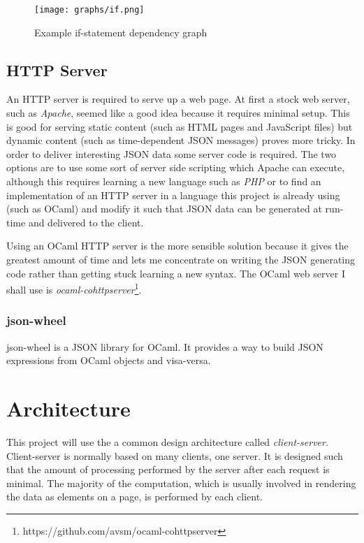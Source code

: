 \begin{figure}
  \centering
  \texttt{[image: graphs/if.png]}
  \caption{Example if-statement dependency graph}
  \label{if_graph}
\end{figure}

\subsection{HTTP Server}
An HTTP server is required to serve up a web page. At first a stock web server, such as \emph{Apache}, seemed like a good idea because it requires minimal setup. This is good for serving static content (such as HTML pages and JavaScript files) but dynamic content (such as time-dependent JSON messages) proves more tricky. In order to deliver interesting JSON data some server code is required. The two options are to use some sort of server side scripting which Apache can execute, although this requires learning a new language such as \emph{PHP} or to find an implementation of an HTTP server in a language this project is already using (such as OCaml) and modify it such that JSON data can be generated at run-time and delivered to the client.

Using an OCaml HTTP server is the more sensible solution because it gives the greatest amount of time and lets me concentrate on writing the JSON generating code rather than getting stuck learning a new syntax. The OCaml web server I shall use is \emph{ocaml-cohttpserver}\footnote{https://github.com/avsm/ocaml-cohttpserver}.

\subsubsection{json-wheel}
json-wheel is a JSON library for OCaml. It provides a way to build JSON expressions from OCaml objects and visa-versa. \cite{bib:json_rfc}

\section{Architecture}

This project will use the a common design architecture called \emph{client-server}. Client-server is normally based on many clients, one server. It is designed such that the amount of processing performed by the server after each request is minimal. The majority of the computation, which is usually involved in rendering the data as elements on a page, is performed by each client. \cite{bib:dist_arch}

